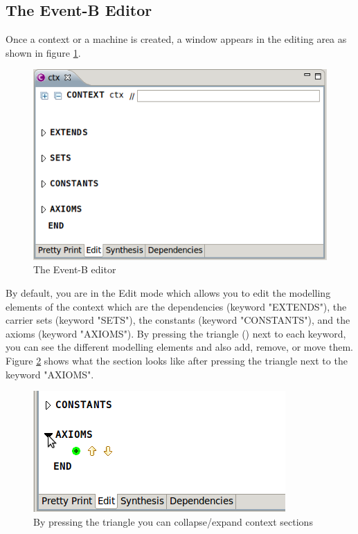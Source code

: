 \subsection{The Event-B Editor}
\label{eventb_editor}

Once a context or a machine is created, a window appears in the editing area as shown in figure \ref{fig_ref_01_eventb_editor1}.

\begin{figure}[!ht]
\begin{center}
	\includegraphics{img/reference/ref_01_eventb_editor1.png}
	\caption{The Event-B editor}
	\label{fig_ref_01_eventb_editor1}
\end{center}
\end{figure}

By default, you are in the \textsf{Edit} mode which allows you to edit the modelling elements of the context which are the dependencies (keyword "EXTENDS"), the carrier sets (keyword "SETS"), the constants (keyword "CONSTANTS"), and the axioms (keyword "AXIOMS"). By pressing the triangle () next to each keyword, you can see the different modelling elements and also add, remove, or move them. Figure \ref{fig_ref_01_eventb_editor2} shows what the section looks like after pressing the triangle next to the keyword "AXIOMS".

\begin{figure}[!ht]
\begin{center}
	\includegraphics{img/reference/ref_01_eventb_editor2.png}
	\caption{By pressing the triangle you can collapse/expand context sections}
	\label{fig_ref_01_eventb_editor2}
\end{center}
\end{figure}

